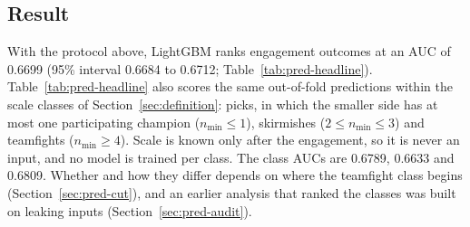 \subsection{Result}\label{sec:pred-headline}

With the protocol above, LightGBM ranks engagement outcomes at an AUC of 0.6699 (95\% interval 0.6684 to
0.6712; Table~\ref{tab:pred-headline}). Table~\ref{tab:pred-headline} also scores the same out-of-fold
predictions within the scale classes of Section~\ref{sec:definition}: picks, in which the smaller side has
at most one participating champion ($n_{\min} \le 1$), skirmishes ($2 \le n_{\min} \le 3$) and teamfights
($n_{\min} \ge 4$). Scale is known only after the engagement, so it is never an input, and no model is
trained per class. The class AUCs are 0.6789, 0.6633 and 0.6809. Whether and how they differ depends on
where the teamfight class begins (Section~\ref{sec:pred-cut}), and an earlier analysis that ranked the
classes was built on leaking inputs (Section~\ref{sec:pred-audit}).

